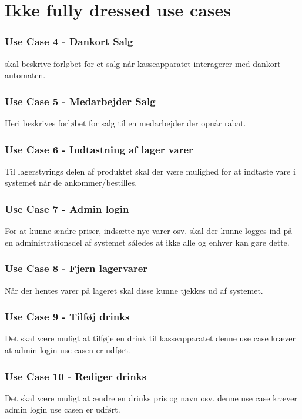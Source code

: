 \section{Ikke fully dressed use cases}

\subsubsection*{Use Case 4 - Dankort Salg}
skal beskrive forløbet for et salg når kasseapparatet interagerer med dankort automaten.

\subsubsection*{Use Case 5 - Medarbejder Salg}
Heri beskrives forløbet for salg til en medarbejder der opnår rabat.

\subsubsection*{Use Case 6 - Indtastning af lager varer}
Til lagerstyrings delen af produktet skal der være mulighed for at indtaste vare i systemet når de ankommer/bestilles.

\subsubsection*{Use Case 7 - Admin login}
For at kunne ændre priser, indsætte nye varer osv. skal der kunne logges ind på en administrationsdel af systemet således at ikke alle og enhver kan gøre dette.

\subsubsection*{Use Case 8 - Fjern lagervarer}
Når der hentes varer på lageret skal disse kunne tjekkes ud af systemet.

\subsubsection*{Use Case 9 - Tilføj drinks}
Det skal være muligt at tilføje en drink til kasseapparatet denne use case kræver at admin login use casen er udført.

\subsubsection*{Use Case 10 - Rediger drinks}
Det skal være muligt at ændre en drinks pris og navn osv. denne use case kræver admin login use casen er udført.

